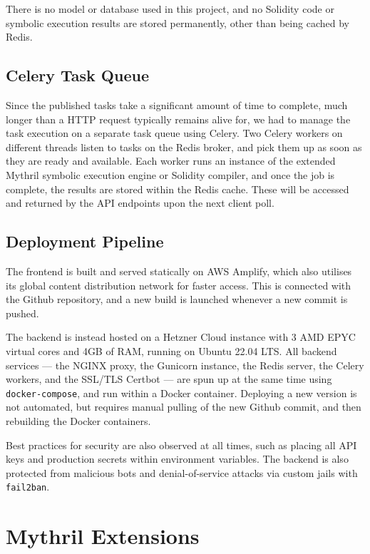There is no model or database used in this project, and no Solidity code or symbolic execution results
are stored permanently, other than being cached by Redis.

\subsection{Celery Task Queue}

Since the published tasks take a significant amount of time to complete,
much longer than a HTTP request typically remains alive for, we had to manage the task execution
on a separate task queue using Celery.
Two Celery workers on different threads listen to tasks 
on the Redis broker, and pick them up as soon as they are ready and available. Each worker runs
an instance of the extended Mythril symbolic execution engine or Solidity compiler, and once 
the job is complete, the results are stored within the Redis cache. These will be accessed
and returned by the API endpoints upon the next client poll.

\subsection{Deployment Pipeline}

The frontend is built and served statically on AWS Amplify, which also utilises its global content
distribution network for faster access. This is connected with the Github repository, and a new build
is launched whenever a new commit is pushed.

The backend is instead hosted on a Hetzner Cloud instance 
with 3 AMD EPYC virtual cores and 4GB of RAM, running on Ubuntu 22.04 LTS. All backend services ---
the NGINX proxy, the Gunicorn instance, the Redis server, the Celery workers, and the SSL/TLS Certbot ---
are spun up at the same time using \texttt{docker-compose}, and run within a Docker container.
Deploying a new version is not automated, but requires manual pulling of the new Github commit, and
then rebuilding the Docker containers.

Best practices for security are also observed at all times, such as placing all API keys and
production secrets within environment variables. The backend is also protected from malicious
bots and denial-of-service attacks via custom jails with \texttt{fail2ban}.

\section{Mythril Extensions}

